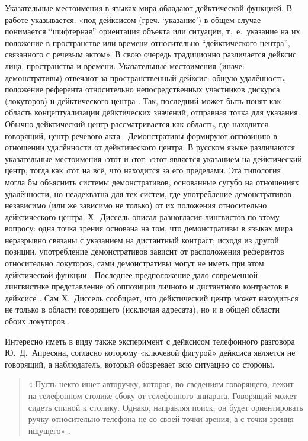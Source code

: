 Указательные местоимения в языках мира обладают дейктической функцией. В работе \parencite[237]{plungian2011} указывается: «под дейксисом (греч. ‘указание’) в общем случае понимается “шифтерная” ориентация объекта или ситуации, т.~е.~указание на их положение в пространстве или времени относительно “дейктического центра”, связанного с речевым актом». В свою очередь традиционно \parencite[117–122]{buhler2011} различается дейксис лица, пространства и времени. Указательные местоимения (иначе: демонстративы) отвечают за пространственный дейксис: общую удалённость, положение референта относительно непосредственных участников дискурса (локуторов) и дейктического центра \parencite[35–36]{diessel1999}. Так, последний может быть понят как область концептуализации дейктических значений, отправная точка для указания. Обычно дейктический центр рассматривается как область, где находится говорящий, центр речевого акта \parencites[254]{plungian2011}[35–36]{diessel1999}. Демонстративы формируют оппозицию в отношении удалённости от дейктического центра. В русском языке различаются указательные местоимения \i{этот} и \i{тот}: \i{этот} является указанием на дейктический центр, тогда как \i{тот} на всё, что находится за его пределами. Эта типология могла бы объяснить системы демонстративов, основанные сугубо на отношениях удалённости, но неадекватна для тех систем, где употребление демонстративов независимо (или же зависимо не только) от их положения относительно дейктического центра. Х.~Диссель описал разногласия лингвистов по этому вопросу: одна точка зрения основана на том, что демонстративы в языках мира неразрывно связаны с указанием на дистантный контраст; исходя из другой позиции, употребление демонстративов зависит от расположения референтов относительно локуторов, сами демонстративы могут не иметь при этом дейктической функции \parencite[37–39]{diessel1999}. Последнее предположение дало современной лингвистике представление об оппозиции личного и дистантного контрастов в дейксисе \parencite[282–286]{anderson_keenan1985}. Сам Х.~Диссель сообщает, что дейктический центр может находиться не только в области говорящего (исключая адресата), но и в общей области обоих локуторов \parencite[41]{diessel1999}.

Интересно иметь в виду также эксперимент с дейксисом телефонного разговора Ю.~Д.~Апресяна, согласно которому «ключевой фигурой» дейксиса является не говорящий, а наблюдатель, который обозревает всю ситуацию со стороны. 

\begin{small}\begin{quote}
«\i{Пусть некто ищет авторучку, которая, по сведениям говорящего, лежит на телефонном столике сбоку от телефонного аппарата. Говорящий может сидеть спиной к столику. Однако, направляя поиск, он будет ориентировать ручку относительно телефона не со своей точки зрения, а с точки зрения ищущего}» \parencite[278]{apresian1986}.
\end{quote}\end{small}

